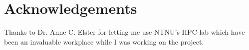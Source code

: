 \section*{Acknowledgements}

Thanks to Dr. Anne C. Elster for letting me use NTNU's HPC-lab which have been an 
invaluable workplace while I was working on the project. 